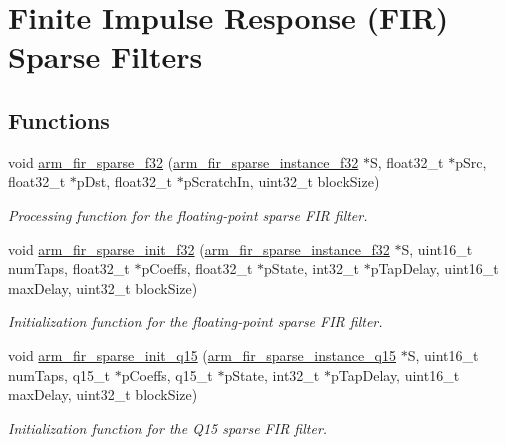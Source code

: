 \hypertarget{group___f_i_r___sparse}{\section{Finite Impulse Response (F\-I\-R) Sparse Filters}
\label{group___f_i_r___sparse}
}
\subsection*{Functions}
\begin{DoxyCompactItemize}
\item 
void \hyperlink{group___f_i_r___sparse_ga23a9284de5ee39406713b91d18ac8838}{arm\-\_\-fir\-\_\-sparse\-\_\-f32} (\hyperlink{structarm__fir__sparse__instance__f32}{arm\-\_\-fir\-\_\-sparse\-\_\-instance\-\_\-f32} $\ast$S, float32\-\_\-t $\ast$p\-Src, float32\-\_\-t $\ast$p\-Dst, float32\-\_\-t $\ast$p\-Scratch\-In, uint32\-\_\-t block\-Size)
\begin{DoxyCompactList}\small\item\em Processing function for the floating-\/point sparse F\-I\-R filter. \end{DoxyCompactList}\item 
void \hyperlink{group___f_i_r___sparse_ga86378a08a9d9e1e0e5de77843b34d396}{arm\-\_\-fir\-\_\-sparse\-\_\-init\-\_\-f32} (\hyperlink{structarm__fir__sparse__instance__f32}{arm\-\_\-fir\-\_\-sparse\-\_\-instance\-\_\-f32} $\ast$S, uint16\-\_\-t num\-Taps, float32\-\_\-t $\ast$p\-Coeffs, float32\-\_\-t $\ast$p\-State, int32\-\_\-t $\ast$p\-Tap\-Delay, uint16\-\_\-t max\-Delay, uint32\-\_\-t block\-Size)
\begin{DoxyCompactList}\small\item\em Initialization function for the floating-\/point sparse F\-I\-R filter. \end{DoxyCompactList}\item 
void \hyperlink{group___f_i_r___sparse_ga5eaa80bf72bcccef5a2c5fc6648d1baa}{arm\-\_\-fir\-\_\-sparse\-\_\-init\-\_\-q15} (\hyperlink{structarm__fir__sparse__instance__q15}{arm\-\_\-fir\-\_\-sparse\-\_\-instance\-\_\-q15} $\ast$S, uint16\-\_\-t num\-Taps, q15\-\_\-t $\ast$p\-Coeffs, q15\-\_\-t $\ast$p\-State, int32\-\_\-t $\ast$p\-Tap\-Delay, uint16\-\_\-t max\-Delay, uint32\-\_\-t block\-Size)
\begin{DoxyCompactList}\small\item\em Initialization function for the Q15 sparse F\-I\-R filter. \end{DoxyCompactList}\item 

\end{DoxyCompactItemize}
